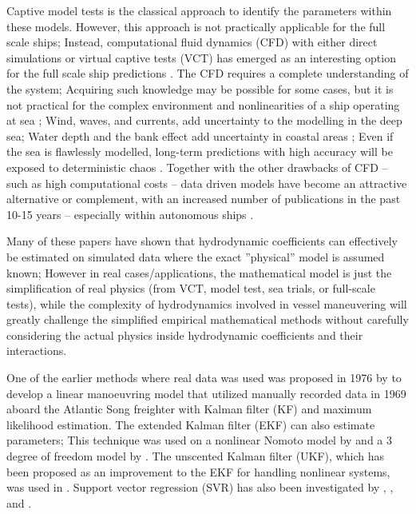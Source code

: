Captive model tests is the classical approach to identify the parameters within these models. However, this approach is not practically applicable for the full scale ships; Instead, computational fluid dynamics (CFD) with either direct simulations or virtual captive tests (VCT) has emerged as an interesting option for the full scale ship predictions \citep{liu_predictions_2018,li_ship_2022}.
The CFD requires a complete understanding of the system; Acquiring such knowledge may be possible for some cases, but it is not practical for the complex environment and nonlinearities of a ship operating at sea \citep{miller_ship_2021};
Wind, waves, and currents, add uncertainty to the modelling in the deep sea; Water depth and the bank effect add uncertainty in coastal areas \citep{nielsen_machine_2022};
Even if the sea is flawlessly modelled, long-term predictions with high accuracy will be exposed to deterministic chaos \citep{lorenz_deterministic_1963}.
Together with the other drawbacks of CFD -- such as high computational costs -- data driven models have become an attractive alternative or complement, with an increased number of publications in the past 10-15 years -- especially within autonomous ships \citep{ahmed_survey_2023}.

Many of these papers have shown that hydrodynamic coefficients can effectively be estimated on simulated data where the exact ''physical'' model is assumed known; However in real cases/applications, the mathematical model is just the simplification of real physics (from VCT, model test, sea trials, or full-scale tests), while the complexity of hydrodynamics involved in vessel maneuvering will greatly challenge the simplified empirical mathematical methods without carefully considering the actual physics inside hydrodynamic coefficients and their interactions.

One of the earlier methods where real data was used was proposed in 1976 by \citet{astrom_identification_1976} to develop a linear manoeuvring model that utilized manually recorded data in 1969 aboard the Atlantic Song freighter with Kalman filter (KF) and maximum likelihood estimation. 
The extended Kalman filter (EKF) can also estimate parameters; This technique was used on a nonlinear Nomoto model by \citet{perera_system_2015} and a 3 degree of freedom model by \citet{shi_identification_2009}. The unscented Kalman filter (UKF), which has been proposed as an improvement to the EKF for handling nonlinear systems, was used in \citet{revestido_herrero_two-step_2012}.
Support vector regression (SVR) has also been investigated by \citet{luo_parameter_2016}, \citet{zhu_parameter_2017}, and \citet{wang_parameter_2021}. 

